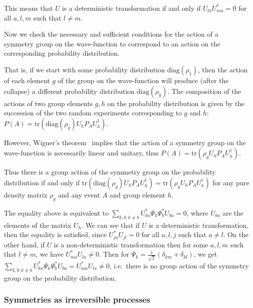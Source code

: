 \documentclass[11pt]{book}
\begin{document}
This means that \(U\) is a deterministic transformation if and only if
\(U_{l a} U_{m a}^*=0\) for all \(a,l,m\) such that \(l\neq m\).

Now we check the necessary and sufficient conditions for the action of a
symmetry group on the wave-function to correspond to an action on the
corresponding probability distribution.

That is, if we start with some probability distribution
\(\mathrm{diag}(\rho_1)\), then the action of each element \(g\) of the
group on the wave-function will produce (after the collapse) a different
probability distribution \(\mathrm{diag}(\rho_g)\). The composition of
the actions of two group elements \(g,h\) on the probability
distribution is given by the succession of the two random experiments
corresponding to \(g\) and \(h\):
\(P(A)=\mathrm{tr}(\mathrm{diag}(\rho_g)U_h P_A U_h^\dagger)\).

However, Wigner's
theorem~\cite{Gehuxe9r2014elementary}\cite{Ruxe4tz1996On}\cite{Molnuxe1r1998algebraic}
implies that the action of a symmetry group on the wave-function is
necessarily linear and unitary, thus
\(P(A)=\mathrm{tr}(\rho_g U_h P_A U_h^\dagger)\).

Thus there is a group action of the symmetry group on the probability
distribution if and only if
\(\mathrm{tr}(\mathrm{diag}(\rho_g)U_h P_A U_h^\dagger)=\mathrm{tr}(\rho_g U_h P_A U_h^\dagger)\)
for any pure density matrix \(\rho_g\) and any event \(A\) and group
element \(h\).

The equality above is equivalent to
\(\sum_{k,b: k\neq b} U_{ka}^*\Psi_k\Psi_b^* U_{ba}=0\), where
\(U_{ba}\) are the elements of the matrix \(U_h\). We can see that if
\(U\) is a deterministic transformation, then the equality is satisfied,
since \(U_{ja}^* U_{jl}=0\) for all \(a,l,j\) such that \(a\neq l\). On
the other hand, if \(U\) is a non-deterministic transformation then for
some \(a,l,m\) such that \(l\neq m\), we have
\(U_{m a}^* U_{l a}\neq 0\). Then for
\(\Psi_k=\frac{1}{\sqrt{2}}(\delta_{km}+\delta_{kl})\), we get
\(\sum_{k,b: k\neq b} U_{ka}^*\Psi_k\Psi_b^* U_{ba}=U_{m a}^* U_{la}\neq 0\),
i.e.~there is no group action of the symmetry group on the probability
distribution.

\hypertarget{symmetries-as-irreversible-processes}{%
\subsubsection{Symmetries as irreversible
processes}\label{symmetries-as-irreversible-processes}}
\end{document}
